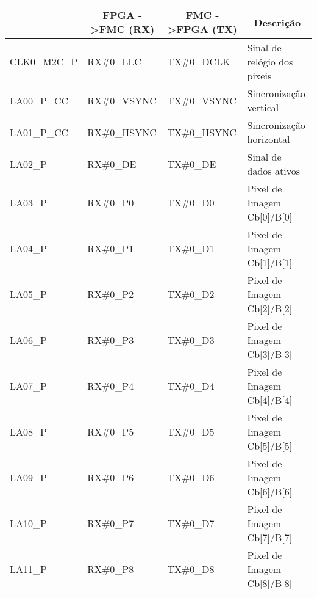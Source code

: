 \begin{longtable}[]
	{@{}llll@{}}
	\hline
	\centering
		\multicolumn{1}{c}{\textbf{PORTA}} & \multicolumn{1}{c}{\textbf{FPGA -\textgreater FMC (RX)}} & \multicolumn{1}{c}{\textbf{FMC -\textgreater FPGA (TX)}} & \multicolumn{1}{c}{\textbf{Descrição}} \\ \hline \endhead		
		CLK0\_M2C\_P & RX\#0\_LLC                         & TX\#0\_DCLK                          & Sinal de relógio dos pixeis          \\ 
		LA00\_P\_CC  & RX\#0\_VSYNC                       & TX\#0\_VSYNC                         & Sincronização vertical               \\ 
		LA01\_P\_CC  & RX\#0\_HSYNC                       & TX\#0\_HSYNC                         & Sincronização horizontal             \\ 
		LA02\_P      & RX\#0\_DE                          & TX\#0\_DE                            & Sinal de dados ativos                \\ 
		LA03\_P      & RX\#0\_P0                          & TX\#0\_D0                            & Pixel de Imagem Cb{[}0{]}/B{[}0{]}   \\ 
		LA04\_P      & RX\#0\_P1                          & TX\#0\_D1                            & Pixel de Imagem Cb{[}1{]}/B{[}1{]}   \\ 
		LA05\_P      & RX\#0\_P2                          & TX\#0\_D2                            & Pixel de Imagem Cb{[}2{]}/B{[}2{]}   \\ 
		LA06\_P      & RX\#0\_P3                          & TX\#0\_D3                            & Pixel de Imagem Cb{[}3{]}/B{[}3{]}   \\ 
		LA07\_P      & RX\#0\_P4                          & TX\#0\_D4                            & Pixel de Imagem Cb{[}4{]}/B{[}4{]}   \\ 
		LA08\_P      & RX\#0\_P5                          & TX\#0\_D5                            & Pixel de Imagem Cb{[}5{]}/B{[}5{]}   \\ 
		LA09\_P      & RX\#0\_P6                          & TX\#0\_D6                            & Pixel de Imagem Cb{[}6{]}/B{[}6{]}   \\ 
		LA10\_P      & RX\#0\_P7                          & TX\#0\_D7                            & Pixel de Imagem Cb{[}7{]}/B{[}7{]}   \\ 
		LA11\_P      & RX\#0\_P8                          & TX\#0\_D8                            & Pixel de Imagem Cb{[}8{]}/B{[}8{]}   \\ 

\end{longtable}
